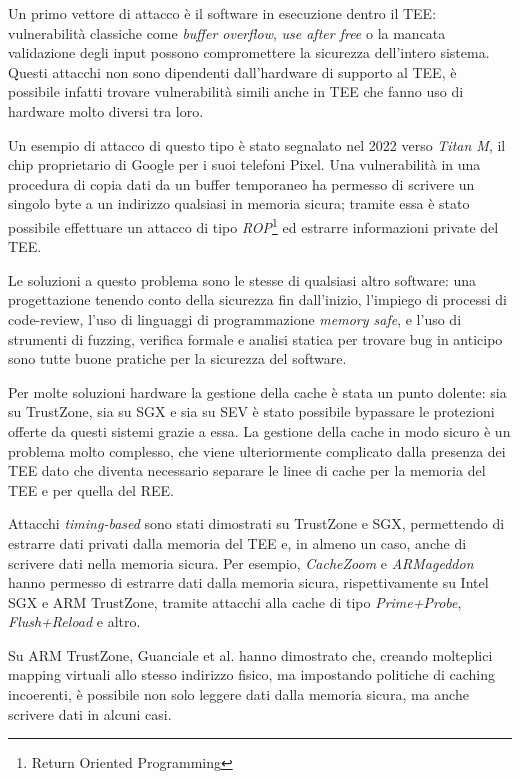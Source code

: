 \documentclass[12pt,italian]{report}
\begin{document}
\medbreak
Un primo vettore di attacco è il software in esecuzione dentro il TEE:
vulnerabilità classiche come \textit{buffer overflow}, \textit{use after free}
o la mancata validazione degli input possono compromettere la sicurezza
dell'intero sistema.
Questi attacchi non sono dipendenti dall'hardware di supporto al TEE,
è possibile infatti trovare vulnerabilità simili anche in TEE che fanno
uso di hardware molto diversi tra loro.

Un esempio di attacco di questo tipo è stato segnalato nel 2022 verso
\textit{Titan M}\cite{attack_titanM}, il chip proprietario di Google
per i suoi telefoni Pixel.
Una vulnerabilità in una procedura di copia dati da un buffer temporaneo
ha permesso di scrivere un singolo byte a un indirizzo qualsiasi in memoria
sicura; tramite essa è stato possibile effettuare un attacco
di tipo \textit{ROP}\footnote{Return Oriented Programming}
ed estrarre informazioni private del TEE.

Le soluzioni a questo problema sono le stesse di qualsiasi altro software:
una progettazione tenendo conto della sicurezza fin dall'inizio, 
l'impiego di processi di code-review, l'uso di linguaggi di programmazione
\textit{memory safe}, e l'uso di strumenti di fuzzing, verifica formale e
analisi statica per trovare bug in anticipo sono tutte buone pratiche per
la sicurezza del software.

\bigbreak \noindent
Per molte soluzioni hardware la gestione della cache è stata
un punto dolente: sia su TrustZone, sia su SGX e sia su SEV
è stato possibile bypassare le protezioni offerte da questi sistemi
grazie a essa.
La gestione della cache in modo sicuro è un problema molto complesso,
che viene ulteriormente complicato dalla presenza dei TEE dato che
diventa necessario separare le linee di cache per la memoria del TEE
e per quella del REE.

Attacchi \textit{timing-based} sono stati dimostrati su TrustZone e SGX,
permettendo di estrarre dati privati dalla memoria del TEE e, in almeno
un caso, anche di scrivere dati nella memoria sicura.
Per esempio, \textit{CacheZoom}\cite{cachezoom} e
\textit{ARMageddon}\cite{armageddon} hanno permesso di estrarre dati
dalla memoria sicura, rispettivamente su Intel SGX e ARM TrustZone,
tramite attacchi alla cache di tipo \textit{Prime+Probe},
\textit{Flush+Reload} e altro.

Su ARM TrustZone, Guanciale et al.\cite{aliasdriven} hanno dimostrato
che, creando molteplici mapping virtuali allo stesso indirizzo fisico,
ma impostando politiche di caching incoerenti, è possibile non solo
leggere dati dalla memoria sicura, ma anche scrivere dati in alcuni casi.
\end{document}
